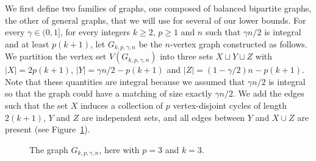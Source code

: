 \documentclass[11pt,a4paper]{article}
\theoremstyle{definition}
\begin{document}
We first define two families of graphs, one composed of balanced bipartite
graphs, the other of general graphs, that we will use for several of our lower
bounds. For every $\gamma \in (0,1]$, for every integers $k \ge 2$, $p \ge 1$ and
$n$ such that $\gamma n/2$ is integral and at least  $p(k+1)$, let
$G_{k,p,\gamma,n}$ be the $n$-vertex graph constructed as follows. We partition
the vertex set $V(G_{k,p,\gamma,n})$ into three sets $X \sqcup Y \sqcup Z$ with
$|X| = 2p(k+1)$, $|Y| = \gamma n/2 - p(k+1)$ and
$|Z| = (1- \gamma/2)n - p(k+1)$. Note that these quantities are integral because
we assumed that $\gamma n/2$ is integral so that the graph could have a matching
of size exactly $\gamma n/2$. We add the edges such that the set $X$ induces a collection of $p$
vertex-disjoint cycles of length $2(k+1)$, $Y$ and $Z$ are independent sets, and
all edges between $Y$ and $X\cup Z$ are present (see
Figure~\ref{fig:non_connectedness}).
  \begin{figure}[ht!]
    \centering        
    \caption{The graph $G_{k,p,\gamma,n}$, here with $p=3$ and $k=3$.}\label{fig:non_connectedness}
  \end{figure}
\end{document}

